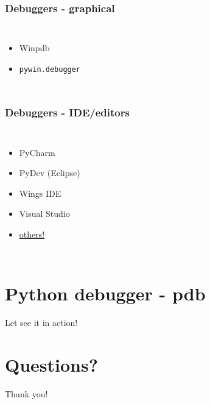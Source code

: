 \documentclass[14pt,notes,svgnames,aspectratio=169]{beamer}
\begin{document}
\begin{frame}
    \frametitle{Debuggers - graphical}
    \begin{columns}
        \begin{itemize}
            \item Winpdb
            \item \lstinline{pywin.debugger}
        \end{itemize}
    \end{columns}
\end{frame}

\begin{frame}
    \frametitle{Debuggers - IDE/editors}
    \begin{columns}
        \begin{itemize}
            \item PyCharm
            \item PyDev (Eclipse)
            \item Wings IDE
            \item Visual Studio
            \item \color{blue}\href{https://wiki.python.org/moin/IntegratedDevelopmentEnvironments}{\uline{others!}}
        \end{itemize}
    \end{columns}
\end{frame}

\begingroup
    \section{Python debugger - pdb}
\endgroup

\begin{frame}
    \centerline{\Large Let see it in action!}
\end{frame}

\begingroup
    \section{Questions?}
\endgroup

\begin{frame}
    \centerline{\Large Thank you!}
\end{frame}
\end{document}
